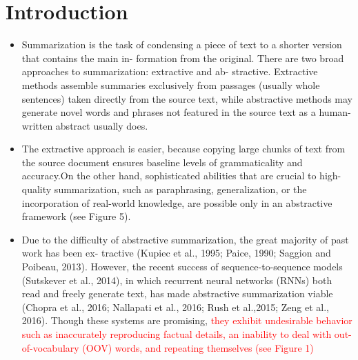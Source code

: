 \documentclass[UTF8]{ctexart}
\begin{document}
    \section{Introduction}
    \begin{itemize}
    \item Summarization is the task of condensing a piece of text to a shorter version that contains the main in-
    formation from the original. There are two broad approaches to summarization: extractive and ab-
    stractive. Extractive methods assemble summaries exclusively from passages (usually whole sentences) taken directly from the source text, while
    abstractive methods may generate novel words and phrases not featured in the source text  as
    a human-written abstract usually does. 

    \item The extractive approach is easier, because copying large chunks of text from the source document ensures
    baseline levels of grammaticality and accuracy.On the other hand, sophisticated abilities that are
    crucial to high-quality summarization, such as paraphrasing, generalization, or the incorporation
    of real-world knowledge, are possible only in an abstractive framework (see Figure 5).
    
    \item Due to the difficulty of abstractive summarization, the great majority of past work has been ex-
    tractive (Kupiec et al., 1995; Paice, 1990; Saggion and Poibeau, 2013). However, the recent success of sequence-to-sequence models (Sutskever et al., 2014), in which recurrent neural networks
    (RNNs) both read and freely generate text, has made abstractive summarization viable (Chopra
    et al., 2016; Nallapati et al., 2016; Rush et al.,2015; Zeng et al., 2016). Though these systems
    are promising,\textcolor{red}{ they exhibit undesirable behavior such as inaccurately reproducing factual details,
    an inability to deal with out-of-vocabulary (OOV) words, and repeating themselves (see Figure 1)}


\end{itemize}
\end{document}
